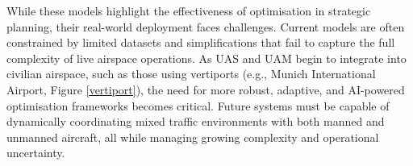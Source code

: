 While these models highlight the effectiveness of optimisation in strategic planning, their real-world deployment faces challenges.
Current models are often constrained by limited datasets and simplifications that fail to capture the full complexity of live airspace operations.
As \gls{UAS} and \gls{UAM} begin to integrate into civilian airspace, such as those using vertiports (e.g., Munich International Airport, Figure \ref{vertiport}), the need for more robust, adaptive, and \gls{AI}-powered optimisation frameworks becomes critical.
Future systems must be capable of dynamically coordinating mixed traffic environments with both manned and unmanned aircraft, all while managing growing complexity and operational uncertainty.











